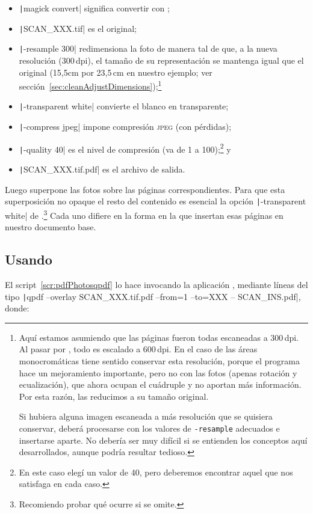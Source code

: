 \documentclass[%
	a5paper,
	10pt,
	twoside,
	openright,
	final,
]{memoir}
\begin{document}
	\begin{itemize}[noitemsep]
		\item \texttt|magick convert| significa convertir con \imagemagick;
		\item \texttt|SCAN_XXX.tif| es el \tiff original;
		\item \texttt|-resample 300| redimensiona la foto de manera tal de que, a la nueva resolución (300\,dpi), el tamaño de su representación se mantenga igual que el original (15,5cm por 23,5\,cm en nuestro ejemplo; ver sección~\ref{sec:cleanAdjustDimensions});\footnote{\label{foot:resample}Aquí estamos asumiendo que las páginas fueron todas escaneadas a 300\,dpi. Al pasar por \scantailor, todo es escalado a 600\,dpi. En el caso de las áreas monocromáticas tiene sentido conservar esta resolución, porque el programa hace un mejoramiento importante, pero no con las fotos (apenas rotación y ecualización), que ahora ocupan el cuádruple y no aportan más información. Por esta razón, las reducimos a su tamaño original.

		Si hubiera alguna imagen escaneada a más resolución que se quisiera conservar, deberá procesarse con los valores de \texttt{-resample} adecuados e insertarse aparte. No debería ser muy difícil si se entienden los conceptos aquí desarrollados, aunque podría resultar tedioso.}
		\item \texttt|-transparent white| convierte el blanco en transparente;
		\item \texttt|-compress jpeg| impone compresión \textsc{jpeg} (con pérdidas);
		\item \texttt|-quality 40| es el nivel de compresión (va de 1 a 100);\footnote{En este caso elegí un valor de 40, pero deberemos encontrar aquel que nos satisfaga en cada caso.} y
		\item \texttt|SCAN_XXX.tif.pdf| es el archivo \pdf de salida.
	\end{itemize}

	Luego superpone las fotos sobre las páginas correspondientes. Para que esta superposición no opaque el resto del contenido es esencial la opción \texttt|-transparent white| de \imagemagick.\footnote{Recomiendo probar qué ocurre si se omite.} Cada uno difiere en la forma en la que insertan esas páginas en nuestro documento base.

	\subsection{Usando \texorpdfstring{\qpdf}{QPDF}\label{sec:pdfPhotosqpdf}} El script~\ref{scr:pdfPhotosqpdf} lo hace invocando la aplicación \qpdf, mediante líneas del tipo \texttt|qpdf --overlay SCAN_XXX.tif.pdf --from=1 --to=XXX -- SCAN_INS.pdf|, donde:
\end{document}
